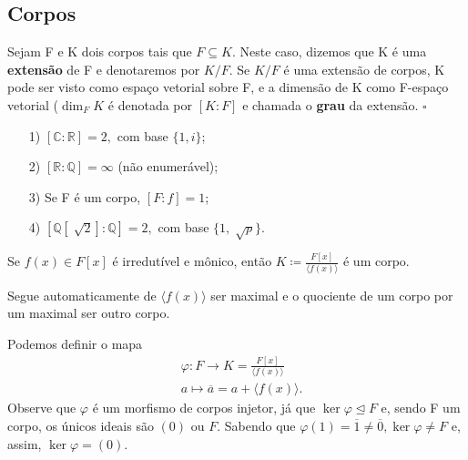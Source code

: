 \documentclass[AlgebraII/algebraII_notes.tex]{subfiles}
\begin{document}
\subsection{Corpos}
\begin{def*}
	Sejam F e K dois corpos tais que \(F\subseteq{K}.\) Neste caso, dizemos que K é uma \textbf{extensão} de F e denotaremos por
	\(K/F.\) Se \(K/F\) é uma extensão de corpos, K pode ser visto como espaço vetorial sobre F, e a dimensão de K
	como F-espaço vetorial (\(\dim_{F}K\) é denotada por \([K:F]\) e chamada o \textbf{grau} da extensão. \(\square\)
\end{def*}
\begin{example}
	\begin{itemize}
		\item[1)] \([\mathbb{C}:\mathbb{R}] = 2,\) com base \(\{1, i\}\);
		\item[2)] \([\mathbb{R}:\mathbb{Q}] = \infty\) (não enumerável);
		\item[3)] Se F é um corpo, \([F:f]=1\);
		\item[4)] \([\mathbb{Q}[\sqrt[]{2}]:\mathbb{Q}] = 2,\) com base \(\{1, \sqrt[]{p}\}\).
	\end{itemize}
\end{example}
\begin{crl*}
	Se \(f(x)\in F[x]\) é irredutível e mônico, então \(K\coloneqq \frac{F[x]}{\langle f(x) \rangle}\) é um corpo.
\end{crl*}
\begin{proof*}
	Segue automaticamente de \(\langle f(x) \rangle \) ser maximal e o quociente de um corpo por um maximal ser outro corpo. \qedsymbol
\end{proof*}
Podemos definir o mapa
\begin{align*}
	 & \varphi :F\rightarrow K=\frac{F[x]}{\langle f(x) \rangle} \\
	 & a\mapsto \overline{a} = a + \langle f(x) \rangle.
\end{align*}
Observe que \(\varphi \) é um morfismo de corpos injetor, já que \(\ker{\varphi } \trianglelefteq{F}\) e,
sendo F um corpo, os únicos ideais são \((0)\) ou \(F\). Sabendo que \(\varphi(1) = \overline{1}\neq\overline{0}, \ker{\varphi }\neq F\) e,
assim, \(\ker{\varphi } = (0).\)
\end{document}

